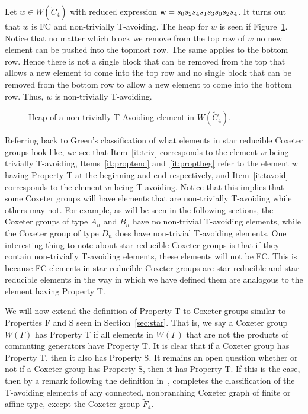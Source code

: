 \begin{example}
Let $w \in W(\widetilde{C}_4)$ with reduced expression $\mathsf{w}=s_0s_2s_4s_1s_3s_0s_2s_4$. It turns out that $w$ is FC and non-trivially T-avoiding. The heap for $w$ is seen if Figure~\ref{fig:sandwich1}. Notice that no matter which block we remove from the top row of $w$ no new element can be pushed into the topmost row. The same applies to the bottom row. Hence there is not a single block that can be removed from the top that allows a new element to come into the top row and no single block that can be removed from the bottom row to allow a new element to come into the bottom row. Thus, $w$ is non-trivially T-avoiding. 
\begin{figure}[h!]
\centering
{}
\caption{Heap of a non-trivially T-Avoiding element in $W(\widetilde{C}_4)$.}\label{fig:sandwich1}	
\end{figure}
\end{example}

Referring back to Green's classification of what elements in star reducible Coxeter groups look like, we see that Item~\ref{it:triv} corresponds to the element $w$ being trivially T-avoiding, Items~\ref{it:proptend} and~\ref{it:proptbeg} refer to the element $w$ having Property T at the beginning and end respectively, and Item~\ref{it:tavoid} corresponds to the element $w$ being T-avoiding. Notice that this implies that some Coxeter groups will have elements that are non-trivially T-avoiding while others may not. For example, as will be seen in the following sections, the Coxeter groups of type $A_n$ and $B_n$ have no non-trivial T-avoiding elements, while the Coxeter group of type $D_n$ does have non-trivial T-avoiding elements. One interesting thing to note about star reducible Coxeter groups is that if they contain non-trivially T-avoiding elements, these elements will not be FC. This is because FC elements in star reducible Coxeter groups are star reducible and star reducible elements in the way in which we have defined them are analogous to the element having Property T.

We will now extend the definition of Property T to Coxeter groups similar to Properties F and S seen in Section~\ref{sec:star}. That is, we say a Coxeter group $W(\Gamma)$ has Property T if all elements in $W(\Gamma)$ that are not the products of commuting generators have Property T. It is clear that if a Coxeter group has Property T, then it also has Property S. It remains an open question whether or not if a Coxeter group has Property S, then it has Property T. If this is the case, then by a remark following the definition in~\cite{Green2007}, completes the classification of the T-avoiding elements of any connected, nonbranching Coxeter graph of finite or affine type, except the Coxeter group $\widetilde{F}_4$. 

